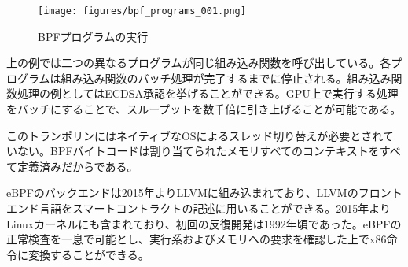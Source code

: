 \documentclass[12pt]{ltjsarticle}
\begin{document}
\begin{figure}
  \begin{center}
    \centering
    \texttt{[image: figures/bpf\_programs\_001.png]}
    \caption[図11]{BPFプログラムの実行\label{fig_11}}
  \end{center}
  \end{figure}

上の例では二つの異なるプログラムが同じ組み込み関数を呼び出している。各プログラムは組み込み関数のバッチ処理が完了するまでに停止される。組み込み関数処理の例としてはECDSA承認を挙げることができる。GPU上で実行する処理をバッチにすることで、スループットを数千倍に引き上げることが可能である。

このトランポリンにはネイティブなOSによるスレッド切り替えが必要とされていない。BPFバイトコードは割り当てられたメモリすべてのコンテキストをすべて定義済みだからである。

eBPFのバックエンドは2015年よりLLVMに組み込まれており、LLVMのフロントエンド言語をスマートコントラクトの記述に用いることができる。2015年よりLinuxカーネルにも含まれており、初回の反復開発は1992年頃であった。eBPFの正常検査を一息で可能とし、実行系およびメモリへの要求を確認した上でx86命令に変換することができる。



\end{document}
